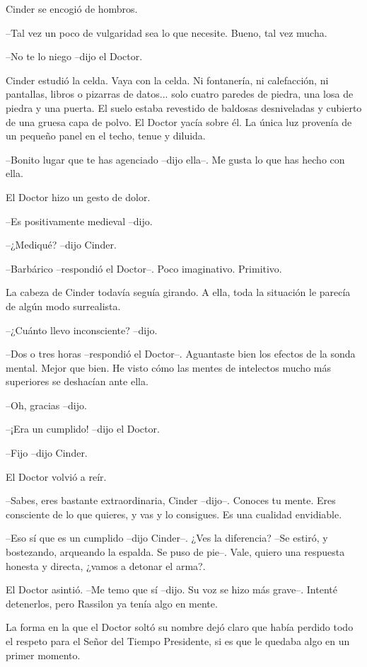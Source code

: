 Cinder se encogió de hombros.

--Tal vez un poco de vulgaridad sea lo que necesite. Bueno, tal vez mucha.

--No te lo niego --dijo el Doctor.

Cinder estudió la celda. Vaya con la celda. Ni fontanería, ni calefacción, ni pantallas, libros o pizarras de datos... solo cuatro paredes de piedra, una losa de piedra y una puerta. El suelo estaba revestido de baldosas desniveladas y cubierto de una gruesa capa de polvo. El Doctor yacía sobre él. La única luz provenía de un pequeño panel en el techo, tenue y diluida. 

--Bonito lugar que te has agenciado --dijo ella--. Me gusta lo que has hecho con ella.

El Doctor hizo un gesto de dolor.

--Es positivamente medieval --dijo.

--¿Mediqué? --dijo Cinder.

--Barbárico --respondió el Doctor--. Poco imaginativo. Primitivo.

La cabeza de Cinder todavía seguía girando. A ella, toda la situación le parecía de algún modo surrealista.

--¿Cuánto llevo inconsciente? --dijo.

--Dos o tres horas --respondió el Doctor--. Aguantaste bien los efectos de la sonda mental. Mejor que bien. He visto cómo las mentes de intelectos mucho más superiores se deshacían ante ella.

--Oh, gracias --dijo.

--¡Era un cumplido! --dijo el Doctor.

--Fijo --dijo Cinder.

El Doctor volvió a reír.

--Sabes, eres bastante extraordinaria, Cinder --dijo--. Conoces tu mente. Eres consciente de lo que quieres, y vas y lo consigues. Es una cualidad envidiable.

--Eso sí que es un cumplido --dijo Cinder--. ¿Ves la diferencia? --Se estiró, y bostezando, arqueando la espalda. Se puso de pie--. Vale, quiero una respuesta honesta y directa, ¿vamos a detonar el arma?.

El Doctor asintió.
--Me temo que sí --dijo. Su voz se hizo más grave--. Intenté detenerlos, pero Rassilon ya tenía algo en mente.

La forma en la que el Doctor soltó su nombre dejó claro que había perdido todo el respeto para el Señor del Tiempo Presidente, si es que le quedaba algo en un primer momento.

